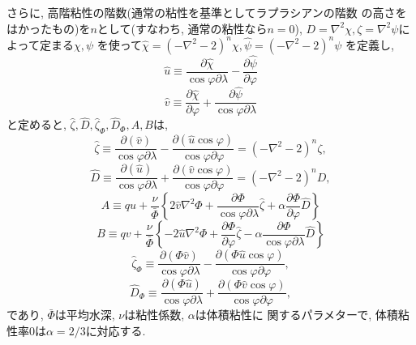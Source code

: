\documentclass[a4j,fleqn]{jarticle}
\begin{document}
\begin{enumerate}
さらに, 高階粘性の階数(通常の粘性を基準としてラプラシアンの階数
の高さをはかったもの)を$n$として(すなわち, 通常の粘性なら$n=0$),
$D=\nabla^2\chi, \zeta=\nabla^2\psi$によって定まる$\chi,\psi$
を使って$\hat\chi=(-\nabla^2-2)^n\chi, \hat\psi=(-\nabla^2-2)^n\psi$
を定義し, 
\begin{equation}
\hat u\equiv\frac{\partial\hat\chi}{\cos\varphi\partial\lambda}
-\frac{\partial\hat\psi}{\partial\varphi}
\end{equation}
\begin{equation}
\hat v\equiv\frac{\partial\hat\chi}{\partial\varphi}
+\frac{\partial\hat\psi}{\cos\varphi\partial\lambda}
\end{equation}
と定めると, $\hat\zeta,\hat D, \hat\zeta_{\Phi},\hat D_{\Phi}, A,B$は,
\begin{equation}
\hat\zeta\equiv
\frac{\partial(\hat v)}{\cos\varphi\partial\lambda}
-\frac{\partial(\hat u\cos\varphi)}{\cos\varphi\partial\varphi}
=(-\nabla^2-2)^n\zeta,
\end{equation}
\begin{equation}
\hat D\equiv
\frac{\partial(\hat u)}{\cos\varphi\partial\lambda}
+\frac{\partial(\hat v\cos\varphi)}{\cos\varphi\partial\varphi}
=(-\nabla^2-2)^n D,
\end{equation}
\begin{equation}
A\equiv qu+\frac{\nu}{\bar\Phi}\left\{2\hat v\nabla^2\Phi
+\frac{\partial\Phi}{\cos\varphi\partial\lambda}\hat\zeta
+\alpha\frac{\partial\Phi}{\partial\varphi}\hat D\right\}
\end{equation}
\begin{equation}
B\equiv qv+\frac{\nu}{\bar\Phi}\left\{-2\hat u\nabla^2\Phi
+\frac{\partial\Phi}{\partial\varphi}\hat\zeta
-\alpha\frac{\partial\Phi}{\cos\varphi\partial\lambda}\hat D\right\}
\end{equation}
\begin{equation}
\hat\zeta_{\Phi}\equiv
\frac{\partial(\Phi\hat v)}{\cos\varphi\partial\lambda}
-\frac{\partial(\Phi\hat u\cos\varphi)}{\cos\varphi\partial\varphi},
\end{equation}
\begin{equation}
\hat D_{\Phi}\equiv
\frac{\partial(\Phi\hat u)}{\cos\varphi\partial\lambda}
+\frac{\partial(\Phi\hat v\cos\varphi)}{\cos\varphi\partial\varphi},
\end{equation}
であり, $\bar\Phi$は平均水深, $\nu$は粘性係数, $\alpha$は体積粘性に
関するパラメターで, 体積粘性率$0$は$\alpha=2/3$に対応する.


\end{enumerate}
\end{document}
